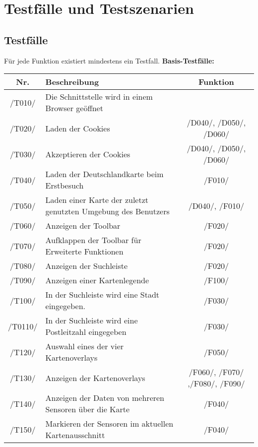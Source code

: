 \section{Testfälle und Testszenarien}
\subsection{Testfälle}

Für jede Funktion existiert mindestens ein Testfall.
\newline
\textbf{Basis-Testfälle:}
\begin{tabularx}{\textwidth}{| c | X | c |}
	\hline
	\textbf{Nr.} & 
    \textbf{Beschreibung} &
    \textbf{Funktion}\\
    \hline
     /T010/ & Die Schnittstelle wird in einem Browser geöffnet & \\
     \hline
     /T020/ & Laden der Cookies & /D040/, /D050/, /D060/\\
     \hline
     /T030/ & Akzeptieren der Cookies &  /D040/, /D050/, /D060/\\
     \hline
     /T040/ & Laden der Deutschlandkarte beim Erstbesuch& /F010/\\
     \hline
     /T050/ & Laden einer Karte der zuletzt genutzten Umgebung des Benutzers & /D040/, /F010/\\
     \hline
     /T060/ & Anzeigen der Toolbar & /F020/\\
     \hline
     /T070/ & Aufklappen der Toolbar für Erweiterte Funktionen & /F020/\\
     \hline
     /T080/ & Anzeigen der Suchleiste & /F020/\\
     \hline
     /T090/ & Anzeigen einer Kartenlegende & /F100/\\
     \hline
     /T100/ & In der Suchleiste wird eine Stadt eingegeben. & /F030/\\
     \hline
     /T0110/ & In der Suchleiste wird eine Postleitzahl eingegeben &  /F030/\\
     \hline
     /T120/ & Auswahl eines der vier Kartenoverlays & /F050/\\
     \hline
     /T130/ & Anzeigen der Kartenoverlays & /F060/, /F070/ ,/F080/, /F090/ \\
     \hline
     /T140/ & Anzeigen der Daten von mehreren Sensoren über die Karte & /F040/\\
     \hline
     /T150/ & Markieren der Sensoren im aktuellen Kartenausschnitt & /F040/\\
     \hline 

\end{tabularx}
